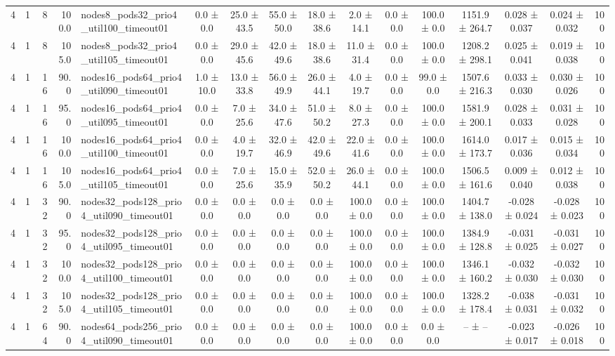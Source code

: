 \begin{tabular}{r r r r l c c c c c c c c c c r}
4 & 1 & 8 & 100.0 & nodes8\_pods32\_prio4\_util100\_timeout01 & 0.0 ± 0.0 & 25.0 ± 43.5 & 55.0 ± 50.0 & 18.0 ± 38.6 & 2.0 ± 14.1 & 0.0 ± 0.0 & 100.0 ± 0.0 & 1151.9 ± 264.7 & 0.028 ± 0.037 & 0.024 ± 0.032 & 100 \\
4 & 1 & 8 & 105.0 & nodes8\_pods32\_prio4\_util105\_timeout01 & 0.0 ± 0.0 & 29.0 ± 45.6 & 42.0 ± 49.6 & 18.0 ± 38.6 & 11.0 ± 31.4 & 0.0 ± 0.0 & 100.0 ± 0.0 & 1208.2 ± 298.1 & 0.025 ± 0.041 & 0.019 ± 0.038 & 100 \\
4 & 1 & 16 & 90.0 & nodes16\_pods64\_prio4\_util090\_timeout01 & 1.0 ± 10.0 & 13.0 ± 33.8 & 56.0 ± 49.9 & 26.0 ± 44.1 & 4.0 ± 19.7 & 0.0 ± 0.0 & 99.0 ± 0.0 & 1507.6 ± 216.3 & 0.033 ± 0.030 & 0.030 ± 0.026 & 100 \\
4 & 1 & 16 & 95.0 & nodes16\_pods64\_prio4\_util095\_timeout01 & 0.0 ± 0.0 & 7.0 ± 25.6 & 34.0 ± 47.6 & 51.0 ± 50.2 & 8.0 ± 27.3 & 0.0 ± 0.0 & 100.0 ± 0.0 & 1581.9 ± 200.1 & 0.028 ± 0.033 & 0.031 ± 0.028 & 100 \\
4 & 1 & 16 & 100.0 & nodes16\_pods64\_prio4\_util100\_timeout01 & 0.0 ± 0.0 & 4.0 ± 19.7 & 32.0 ± 46.9 & 42.0 ± 49.6 & 22.0 ± 41.6 & 0.0 ± 0.0 & 100.0 ± 0.0 & 1614.0 ± 173.7 & 0.017 ± 0.036 & 0.015 ± 0.034 & 100 \\
4 & 1 & 16 & 105.0 & nodes16\_pods64\_prio4\_util105\_timeout01 & 0.0 ± 0.0 & 7.0 ± 25.6 & 15.0 ± 35.9 & 52.0 ± 50.2 & 26.0 ± 44.1 & 0.0 ± 0.0 & 100.0 ± 0.0 & 1506.5 ± 161.6 & 0.009 ± 0.040 & 0.012 ± 0.038 & 100 \\
4 & 1 & 32 & 90.0 & nodes32\_pods128\_prio4\_util090\_timeout01 & 0.0 ± 0.0 & 0.0 ± 0.0 & 0.0 ± 0.0 & 0.0 ± 0.0 & 100.0 ± 0.0 & 0.0 ± 0.0 & 100.0 ± 0.0 & 1404.7 ± 138.0 & -0.028 ± 0.024 & -0.028 ± 0.023 & 100 \\
4 & 1 & 32 & 95.0 & nodes32\_pods128\_prio4\_util095\_timeout01 & 0.0 ± 0.0 & 0.0 ± 0.0 & 0.0 ± 0.0 & 0.0 ± 0.0 & 100.0 ± 0.0 & 0.0 ± 0.0 & 100.0 ± 0.0 & 1384.9 ± 128.8 & -0.031 ± 0.025 & -0.031 ± 0.027 & 100 \\
4 & 1 & 32 & 100.0 & nodes32\_pods128\_prio4\_util100\_timeout01 & 0.0 ± 0.0 & 0.0 ± 0.0 & 0.0 ± 0.0 & 0.0 ± 0.0 & 100.0 ± 0.0 & 0.0 ± 0.0 & 100.0 ± 0.0 & 1346.1 ± 160.2 & -0.032 ± 0.030 & -0.032 ± 0.030 & 100 \\
4 & 1 & 32 & 105.0 & nodes32\_pods128\_prio4\_util105\_timeout01 & 0.0 ± 0.0 & 0.0 ± 0.0 & 0.0 ± 0.0 & 0.0 ± 0.0 & 100.0 ± 0.0 & 0.0 ± 0.0 & 100.0 ± 0.0 & 1328.2 ± 178.4 & -0.038 ± 0.031 & -0.031 ± 0.032 & 100 \\
4 & 1 & 64 & 90.0 & nodes64\_pods256\_prio4\_util090\_timeout01 & 0.0 ± 0.0 & 0.0 ± 0.0 & 0.0 ± 0.0 & 0.0 ± 0.0 & 100.0 ± 0.0 & 0.0 ± 0.0 & 0.0 ± 0.0 & -- ± -- & -0.023 ± 0.017 & -0.026 ± 0.018 & 100 \\

\end{tabular}
